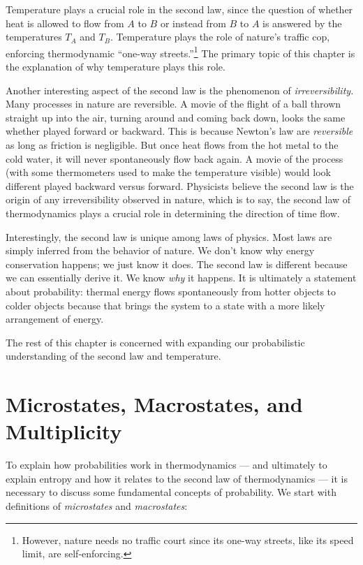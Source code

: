 Temperature plays a crucial role in the second law, since the question
of whether heat is allowed to flow from $A$ to $B$ or instead from $B$
to $A$ is answered by the temperatures $T_A$ and $T_B$.  Temperature
plays the role of nature's traffic cop, enforcing thermodynamic
``one-way streets.''\footnote{However, nature needs no traffic court
  since its one-way streets, like its speed limit, are
  self-enforcing.}  The primary topic of this chapter is the
explanation of why temperature plays this role.

Another interesting aspect of the second law is the phenomenon of {\it
irreversibility.}  Many processes in nature are reversible.  A movie of
the flight of a ball thrown straight up into the air, turning around and
coming back down, looks the same whether played forward or backward.
This is because Newton's law are {\it reversible} as long as friction
is negligible.  But once heat flows from the hot metal to the cold
water, it will never spontaneously  flow back again.  A movie of the
process (with some thermometers used to make the temperature visible)
would look different played backward versus forward.  Physicists believe
the second law is the origin of any irreversibility observed in nature,
which is to say, the second law of thermodynamics plays a crucial role
in determining the direction of time flow.

Interestingly, the second law is unique among laws of physics.  Most
laws are simply inferred from the behavior of nature.  We don't know
why energy conservation happens; we just know it does.  The second law
is different because we can essentially derive it.  We know {\it why}
it happens.  It is ultimately a statement about probability: thermal
energy flows spontaneously from hotter objects to colder objects
because that brings the system to a state with a more 
likely arrangement of energy.  

The rest of this chapter is concerned with expanding our probabilistic
understanding of the second law and temperature.  

\section{Microstates, Macrostates, and Multiplicity}

To explain how probabilities work in thermodynamics --- and ultimately
to explain entropy and how it relates to the second law of
thermodynamics --- it is necessary to discuss some fundamental
concepts of probability.  We start with definitions of 
{\em microstates} and {\em macrostates}:

